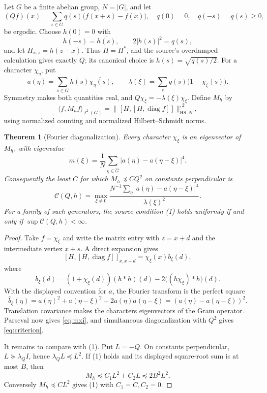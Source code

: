 \documentclass[10pt]{article}
\newtheorem{theorem}{Theorem}
\newcommand{\HS}{\mathrm{HS}}
\begin{document}
Let $G$ be a finite abelian group, $N=|G|$, and let
\[
 (Qf)(x)=\sum_{s\in G}q(s)\bigl(f(x+s)-f(x)\bigr),
 \quad q(0)=0,\quad q(-s)=q(s)\geq0,
\]
be ergodic.  Choose $h(0)=0$ with
\[
 h(-s)=\overline{h(s)},\qquad 2|h(s)|^2=q(s),
\]
and let $H_{x,z}=h(z-x)$.  Thus $H=H^*$, and the source's overdamped
calculation gives exactly $Q$; its canonical choice is $h(s)=\sqrt{q(s)/2}$.
For a character $\chi_\eta$, put
\[
 a(\eta)=\sum_{s\in G}h(s)\overline{\chi_\eta(s)},\qquad
 \lambda(\xi)=\sum_sq(s)\bigl(1-\chi_\xi(s)\bigr).
\]
Symmetry makes both quantities real, and $Q\chi_\xi=-\lambda(\xi)\chi_\xi$.
Define $M_h$ by
\[
 \langle f,M_hf\rangle_{\ell^2(G)}
 =\|[H,[H,\operatorname{diag}f]]\|_{\HS,N}^{,2},
\]
using normalized counting and normalized Hilbert--Schmidt norms.

\begin{theorem}[Fourier diagonalization]\label{thm:fourier}
Every character $\chi_\xi$ is an eigenvector of $M_h$, with eigenvalue
\begin{equation}\label{eq:mxi}
 m(\xi)=\frac1N\sum_{\eta\in\widehat G}
             |a(\eta)-a(\eta-\xi)|^4.
\end{equation}
Consequently the least $C$ for which $M_h\preceq C Q^2$ on constants
perpendicular is
\begin{equation}\label{eq:criterion}
 \mathcal C(Q,h)=\max_{\xi\ne0}
 \frac{N^{-1}\sum_\eta|a(\eta)-a(\eta-\xi)|^4}
      {\lambda(\xi)^2}.
\end{equation}
For a family of such generators, the source condition (1) holds uniformly if
and only if $\sup\mathcal C(Q,h)<\infty$.
\end{theorem}

\begin{proof}
Take $f=\chi_\xi$ and write the matrix entry with $z=x+d$ and the intermediate
vertex $x+s$.  A direct expansion gives
\[
 [H,[H,\operatorname{diag}f]]_{x,x+d}=\chi_\xi(x)b_\xi(d),
\]
where
\[
 b_\xi(d)=(1+\chi_\xi(d))(h*h)(d)
             -2\bigl((h\chi_\xi)*h\bigr)(d).
\]
With the displayed convention for $a$, the Fourier transform is the perfect
square
\[
 \widehat b_\xi(\eta)
   =a(\eta)^2+a(\eta-\xi)^2-2a(\eta)a(\eta-\xi)
   =(a(\eta)-a(\eta-\xi))^2.
\]
Translation covariance makes the characters eigenvectors of the Gram
operator.  Parseval now gives \eqref{eq:mxi}, and simultaneous diagonalization
with $Q^2$ gives \eqref{eq:criterion}.

It remains to compare with (1).  Put $L=-Q$.  On constants perpendicular,
$L\succeq\lambda_Q I$, hence $\lambda_QL\preceq L^2$.  If (1) holds and its
displayed square-root sum is at most $B$, then
\[
 M_h\preceq C_1L^2+C_2L\preceq2B^2L^2.
\]
Conversely $M_h\preceq C L^2$ gives (1) with $C_1=C,C_2=0$.
\end{proof}
\end{document}
